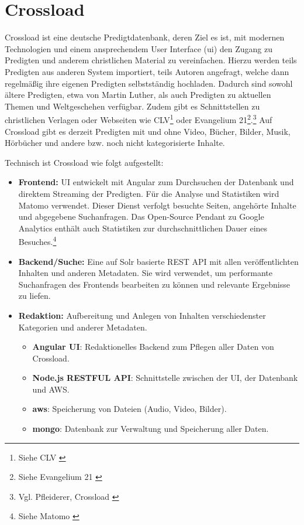 \clearpage
\section{Crossload}
\label{sec:crossload}
Crossload ist eine deutsche Predigtdatenbank, deren Ziel es ist, mit modernen Technologien und einem ansprechendem User Interface (\gls{ui}) den Zugang zu Predigten und anderem christlichen Material zu vereinfachen.
Hierzu werden teils Predigten aus anderen System importiert, teils Autoren angefragt, welche dann regelmäßig ihre eigenen Predigten selbstständig hochladen.
Dadurch sind sowohl ältere Predigten, etwa von Martin Luther, als auch Predigten zu aktuellen Themen und Weltgeschehen verfügbar.
Zudem gibt es Schnittstellen zu christlichen Verlagen oder Webseiten wie CLV\footnote{Siehe CLV \cite{clv2022}} oder Evangelium 21\footnote{Siehe Evangelium 21 \cite{evangelium21e.v.2022}}.\footnote{Vgl. Pfleiderer, Crossload \cite{pfleiderer2022}}
Auf Crossload gibt es derzeit Predigten mit und ohne Video, Bücher, Bilder, Musik, Hörbücher und andere bzw. noch nicht kategorisierte Inhalte.

Technisch ist Crossload wie folgt aufgestellt:
\begin{itemize}
  \item \textbf{Frontend:} UI entwickelt mit Angular zum Durchsuchen der Datenbank und direktem Streaming der Predigten. Für die Analyse und Statistiken wird Matomo verwendet. Dieser Dienst verfolgt besuchte Seiten, angehörte Inhalte und abgegebene Suchanfragen. Das Open-Source Pendant zu Google Analytics enthält auch Statistiken zur durchschnittlichen Dauer eines Besuches.\footnote{Siehe Matomo \cite{matomo2022}}
  \item \textbf{Backend/Suche:} Eine auf Solr basierte REST API mit allen veröffentlichten Inhalten und anderen Metadaten. Sie wird verwendet, um performante Suchanfragen des Frontends bearbeiten zu können und relevante Ergebnisse zu liefen.
  \item \textbf{Redaktion:} Aufbereitung und Anlegen von Inhalten verschiedenster Kategorien und anderer Metadaten.
  \begin{itemize}
    \item \textbf{Angular UI}: Redaktionelles Backend zum Pflegen aller Daten von Crossload.
    \item \textbf{Node.js RESTFUL API}: Schnittstelle zwischen der UI, der Datenbank und AWS.
    \item \textbf{\gls{aws}}: Speicherung von Dateien (Audio, Video, Bilder).
    \item \textbf{\gls{mongo}}: Datenbank zur Verwaltung und Speicherung aller Daten.
  \end{itemize}
\end{itemize}
